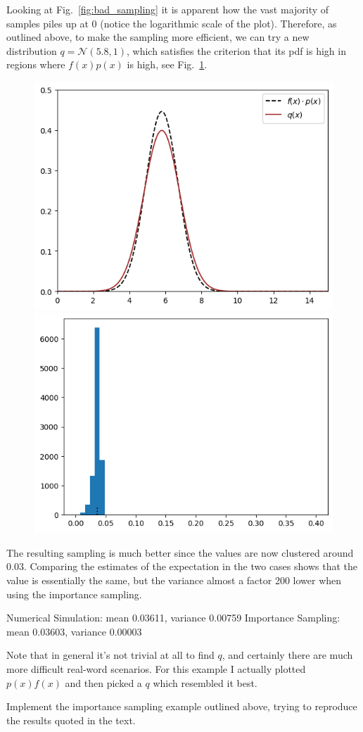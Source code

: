 \documentclass[12pt,a4paper]{article}
\begin{document}
Looking at Fig.~\ref{fig:bad_sampling} it is apparent how the vast majority of samples piles up at 0 (notice the logarithmic scale of the plot). 
Therefore, as outlined above, to make the sampling more efficient, we can try a new distribution $q = \mathcal{N}(5.8, 1)$, which satisfies the criterion that its pdf is high in regions where $f(x)p(x)$ is high, see Fig.~\ref{fig:fp_and_q}.

\begin{figure}[htbp]
\begin{center}
\includegraphics[width=0.4\linewidth]{addons/fp_and_q}
\includegraphics[width=0.4\linewidth]{addons/good_sampling}
\end{center}
\label{fig:fp_and_q}
\end{figure}

The resulting sampling is much better since the values are now clustered around 0.03. Comparing the estimates of the expectation in the two cases shows that the value is essentially the same, but the variance almost a factor 200 lower when using the importance sampling.
\begin{ioutput}
Numerical Simulation: mean 0.03611, variance 0.00759
Importance Sampling: mean 0.03603, variance 0.00003
\end{ioutput}
Note that in general it’s not trivial at all to find $q$, and certainly there are much more difficult real-word scenarios. For this example I actually plotted $p(x)f(x)$ and then picked a $q$ which resembled it best.

\begin{question}
Implement the importance sampling example outlined above, trying to reproduce the results quoted in the text.
\end{question}
\end{document}
